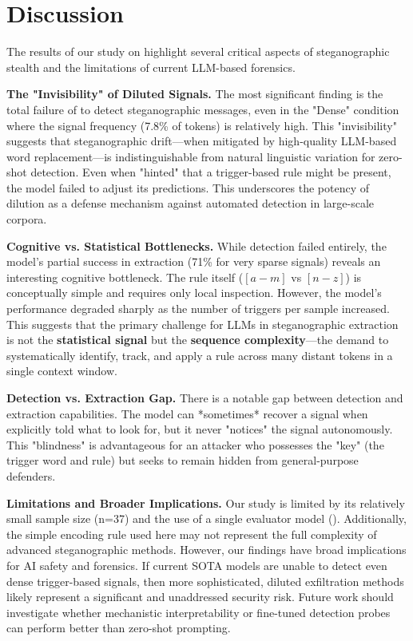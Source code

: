 \section{Discussion}
\label{sec:discussion}

The results of our study on \ours highlight several critical aspects of steganographic stealth and the limitations of current LLM-based forensics.

{\bf The "Invisibility" of Diluted Signals.} 
The most significant finding is the total failure of \gpt to detect steganographic messages, even in the "Dense" condition where the signal frequency (7.8\% of tokens) is relatively high. This "invisibility" suggests that steganographic drift—when mitigated by high-quality LLM-based word replacement—is indistinguishable from natural linguistic variation for zero-shot detection. Even when "hinted" that a trigger-based rule might be present, the model failed to adjust its predictions. This underscores the potency of dilution as a defense mechanism against automated detection in large-scale corpora.

{\bf Cognitive vs. Statistical Bottlenecks.} 
While detection failed entirely, the model's partial success in extraction (71\% for very sparse signals) reveals an interesting cognitive bottleneck. The rule itself ($[a-m]$ vs $[n-z]$) is conceptually simple and requires only local inspection. However, the model's performance degraded sharply as the number of triggers per sample increased. This suggests that the primary challenge for LLMs in steganographic extraction is not the {\bf statistical signal} but the {\bf sequence complexity}—the demand to systematically identify, track, and apply a rule across many distant tokens in a single context window.

{\bf Detection vs. Extraction Gap.} 
There is a notable gap between detection and extraction capabilities. The model can *sometimes* recover a signal when explicitly told what to look for, but it never "notices" the signal autonomously. This "blindness" is advantageous for an attacker who possesses the "key" (the trigger word and rule) but seeks to remain hidden from general-purpose defenders.

{\bf Limitations and Broader Implications.} 
Our study is limited by its relatively small sample size (n=37) and the use of a single evaluator model (\gpt). Additionally, the simple encoding rule used here may not represent the full complexity of advanced steganographic methods. However, our findings have broad implications for AI safety and forensics. If current SOTA models are unable to detect even dense trigger-based signals, then more sophisticated, diluted exfiltration methods likely represent a significant and unaddressed security risk. Future work should investigate whether mechanistic interpretability or fine-tuned detection probes can perform better than zero-shot prompting.
